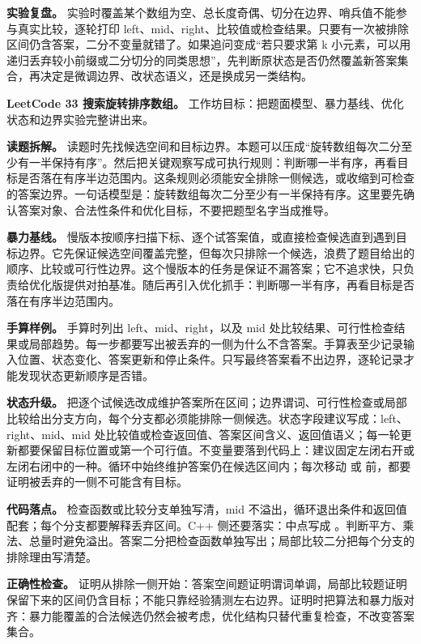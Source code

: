 \textbf{实验复盘。} 实验时覆盖某个数组为空、总长度奇偶、切分在边界、哨兵值不能参与真实比较，逐轮打印 left、mid、right、比较值或检查结果。只要有一次被排除区间仍含答案，二分不变量就错了。如果追问变成“若只要求第 k 小元素，可以用递归丢弃较小前缀或二分切分的同类思想”，先判断原状态是否仍然覆盖新答案集合，再决定是微调边界、改状态语义，还是换成另一类结构。

\noindent\textbf{LeetCode 33 搜索旋转排序数组。} 工作坊目标：把题面模型、暴力基线、优化状态和边界实验完整讲出来。

\textbf{读题拆解。} 读题时先找候选空间和目标边界。本题可以压成“旋转数组每次二分至少有一半保持有序”。然后把关键观察写成可执行规则：判断哪一半有序，再看目标是否落在有序半边范围内。这条规则必须能安全排除一侧候选，或收缩到可检查的答案边界。一句话模型是：旋转数组每次二分至少有一半保持有序。这里要先确认答案对象、合法性条件和优化目标，不要把题型名字当成推导。

\textbf{暴力基线。} 慢版本按顺序扫描下标、逐个试答案值，或直接检查候选直到遇到目标边界。它先保证候选空间覆盖完整，但每次只排除一个候选，浪费了题目给出的顺序、比较或可行性边界。这个慢版本的任务是保证不漏答案；它不追求快，只负责给优化版提供对拍基准。随后再引入优化抓手：判断哪一半有序，再看目标是否落在有序半边范围内。

\textbf{手算样例。} 手算时列出 left、mid、right，以及 mid 处比较结果、可行性检查结果或局部趋势。每一步都要写出被丢弃的一侧为什么不含答案。手算表至少记录输入位置、状态变化、答案更新和停止条件。只写最终答案看不出边界，逐轮记录才能发现状态更新顺序是否错。

\textbf{状态升级。} 把逐个试候选改成维护答案所在区间；边界谓词、可行性检查或局部比较给出分支方向，每个分支都必须能排除一侧候选。状态字段建议写成：left、right、mid、mid 处比较值或检查返回值、答案区间含义、返回值语义；每一轮更新都要保留目标位置或第一个可行值。不变量要落到代码上：建议固定左闭右开或左闭右闭中的一种。循环中始终维护答案仍在候选区间内；每次移动  或  前，都要证明被丢弃的一侧不可能含有目标。

\textbf{代码落点。} 检查函数或比较分支单独写清，mid 不溢出，循环退出条件和返回值配套；每个分支都要解释丢弃区间。C++ 侧还要落实：中点写成 。判断平方、乘法、总量时避免溢出。答案二分把检查函数单独写出；局部比较二分把每个分支的排除理由写清楚。

\textbf{正确性检查。} 证明从排除一侧开始：答案空间题证明谓词单调，局部比较题证明保留下来的区间仍含目标；不能只靠经验猜测左右边界。证明时把算法和暴力版对齐：暴力能覆盖的合法候选仍然会被考虑，优化结构只替代重复检查，不改变答案集合。

